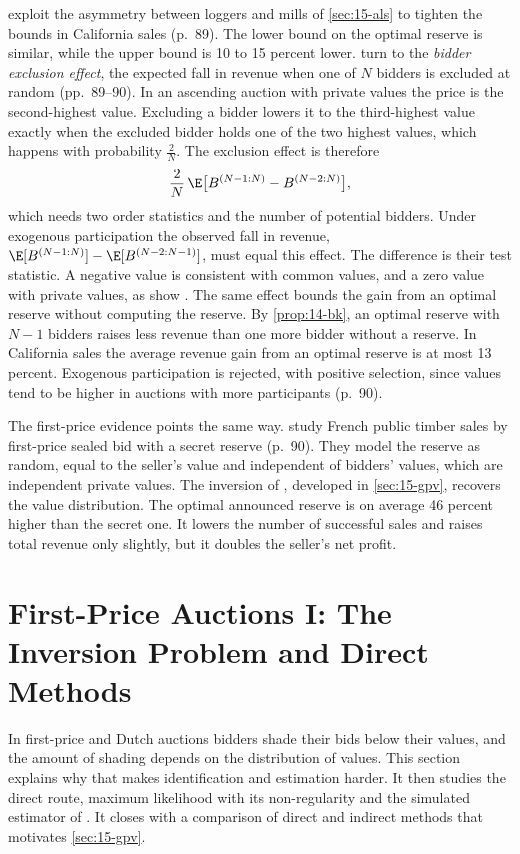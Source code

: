 \citet{CoeyEtAl2017} exploit the asymmetry between loggers and mills of \cref{sec:15-als} to tighten
the bounds in California sales (p.~89). The lower bound on the optimal reserve is similar, while the upper bound
is 10 to 15 percent lower. \citet{CoeyLarsenSweeney2019} turn to the \emph{bidder exclusion effect}, the expected
fall in revenue when one of $N$ bidders is excluded at random (pp.~89--90). In an ascending auction with
private values the price is the second-highest value. Excluding a bidder lowers it to the third-highest value
exactly when the excluded bidder holds one of the two highest values, which happens with probability
$\frac{2}{N}$. The exclusion effect is therefore
\[
\frac{2}{N}\,\E\big[B^{(N-1:N)}-B^{(N-2:N)}\big],
\]
which needs two order statistics and the number of potential bidders. Under exogenous participation the
observed fall in revenue, $\E[B^{(N-1:N)}]-\E[B^{(N-2:N-1)}]$, must equal this effect. The difference is their
test statistic. A negative value is consistent with common values, and a zero value with private values, as
\citet{AtheyHaile2002} show \citep[footnote~6]{HortacsuPerrigne2021}. The same effect bounds the gain from an
optimal reserve without computing the reserve. By \cref{prop:14-bk}, an optimal reserve with $N-1$ bidders
raises less revenue than one more bidder without a reserve. In California sales the average revenue gain from
an optimal reserve is at most 13 percent. Exogenous participation is rejected, with positive selection, since
values tend to be higher in auctions with more participants (p.~90).

The first-price evidence points the same way. \citet{LiPerrigne2003} study French public timber sales by
first-price sealed bid with a secret reserve (p.~90). They model the reserve as random, equal to the seller's
value and independent of bidders' values, which are independent private values. The inversion of
\citet{GuerrePerrigneVuong2000}, developed in \cref{sec:15-gpv}, recovers the value distribution. The optimal announced reserve is on average 46 percent higher
than the secret one. It lowers the number of successful sales and raises total revenue only slightly, but it
doubles the seller's net profit.

\section{First-Price Auctions I: The Inversion Problem and Direct Methods}\label{sec:15-direct}

In first-price and Dutch auctions bidders shade their bids below their values, and the amount of shading depends on
the distribution of values. This section explains why that makes identification and estimation harder. It then
studies the direct route, maximum likelihood with its non-regularity and the simulated estimator of
\citet{LaffontOssardVuong1995}. It closes with a comparison of direct and indirect methods that motivates
\cref{sec:15-gpv}.

